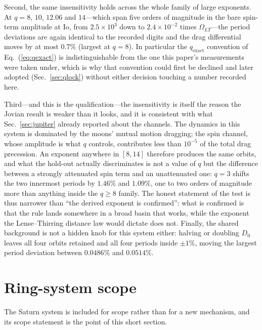 \documentclass[aps,reprint,amsmath,amssymb,nofootinbib,superscriptaddress,floatfix]{revtex4-2}
\begin{document}
Second, the same insensitivity holds across the whole family of large
exponents.
At $q=8$, $10$, $12.06$ and $14$---which span five orders of magnitude
in the bare spin-term amplitude at Io, from $2.5\times10^{3}$ down to
$2.4\times10^{-2}$ times $\Omega_{LT}$---the period deviations are again
identical to the recorded digits and the drag differential moves by at
most $0.7\%$ (largest at $q=8$).
In particular the $q_{\mathrm{exact}}$ convention of
Eq.~(\ref{eq:qexact}) is indistinguishable from the one this paper's
measurements were taken under, which is why that convention could
first be declined and later adopted (Sec.~\ref{sec:qlock}) without
either decision touching a number recorded here.

Third---and this is the qualification---the insensitivity is itself the
reason the Jovian result is weaker than it looks, and it is consistent
with what Sec.~\ref{sec:jupiter} already reported about the channels.
The dynamics in this system is dominated by the moons' mutual motion
dragging; the spin channel, whose amplitude is what $q$ controls,
contributes less than $10^{-5}$ of the total drag precession.
An exponent anywhere in $[8,14]$ therefore produces the same orbits,
and what the hold-out actually discriminates is not a value of $q$ but
the difference between a strongly attenuated spin term and an
unattenuated one: $q=3$ shifts the two innermost periods by $1.46\%$ and
$1.09\%$, one to two orders of magnitude more than anything inside the
$q\geq8$ family.
The honest statement of the test is thus narrower than ``the derived
exponent is confirmed'': what is confirmed is that the rule lands
somewhere in a broad basin that works, while the exponent the
Lense--Thirring distance law would dictate does not.
Finally, the shared background is not a hidden knob for this system
either: halving or doubling $D_0$ leaves all four orbits retained and
all four periods inside $\pm1\%$, moving the largest period deviation
between $0.0486\%$ and $0.0514\%$.

\section{Ring-system scope}
\label{sec:ring}

The Saturn system is included for scope rather than for a new
mechanism, and its scope statement is the point of this short section.
\end{document}
